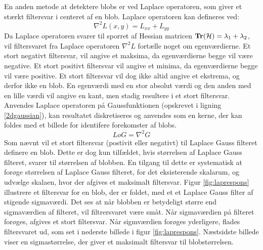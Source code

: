        \vspace{-2.7em}
\noindent
En anden metode at detektere blobs er ved Laplace operatoren, som giver et stærkt filtersvar i centeret af en blob. Laplace operatoren kan defineres ved:
\begin{equation}
\nabla^2L(x,y) = L_{xx}+L_{yy}
\end{equation}
Da Laplace operatoren svarer til sporret af Hessian matricen $\bold{Tr}(\mathcal{H}) = \lambda_1 + \lambda_2$, vil filtersvaret fra Laplace operatoren $\nabla^2L$ fortælle noget om egenværdierne. Et stort negativt filtersvar, vil angive et maksima, da egenværdierne begge vil være negative. Et stort positivt filtersvar vil angive et minima, da egenværdierne begge vil være positive. Et stort filtersvar vil dog ikke altid angive et ekstrema, og derfor ikke en blob. En egenværdi med en stor absolut værdi og den anden med en lille værdi vil angive en kant, men stadig resultere i et stort filtersvar.
\label{laplaceblob}
Anvendes Laplace operatoren på Gaussfunktionen (opskrevet i ligning \eqref{2dgaussian}), kan resultatet diskretiseres og anvendes som en kerne, der kan foldes med et billede for identifere forekomster af blobs.
\begin{equation}
LoG= \nabla^2 G
\label{lap}
\end{equation}
Som nævnt vil et stort filtersvar (postivit eller negativt) til Laplace Gauss filteret definere en blob. Dette er dog kun tilfældet, hvis størrelsen af Laplace Gauss filteret, svarer til størrelsen af blobben. En tilgang til dette er systematisk at forøge størrelsen af Laplace Gauss filteret, for det eksisterende skalarum, og udvælge skalaen, hvor der afgives et maksimalt filtersvar. Figur \ref{fig:laprespons} illustrere et filtersvar for en blob, der er foldet, med et et Laplace Gauss filter af stigende sigmaværdi. Det ses at når blobben er betydeligt større end sigmaværdien af filteret, vil filtrersvaret være småt. Når sigmaværdien på filteret forøges, afgives et stort filtersvar. Når sigmværdien forøges yderligere, flades filtersvaret ud, som set i nederste billede i figur \ref{fig:laprespons}. Næstsidste billede viser en sigmastørrelse, der giver et maksimalt filtersvar til blobstørrelsen.
